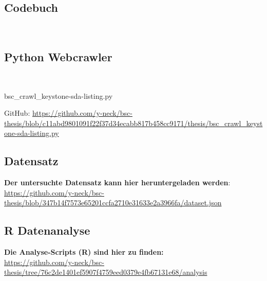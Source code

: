 \documentclass[12pt,a4paper]{article}        %
\begin{document}
\subsection{Codebuch}
~\label{appendix_codebook}

\subsection{Python Webcrawler}
~\label{appendix_crawler}
\begin{lstinputlisting}[language=Python, caption=Python Webcrawler für Keystone-SDA]{bsc_crawl_keystone-sda-listing.py}
\end{lstinputlisting}
GitHub: \url{https://github.com/y-neck/bsc-thesis/blob/c11abd9801091f22f37d34ecabb817b458cc9171/thesis/bsc_crawl_keystone-sda-listing.py}
\subsection{Datensatz}
\label{appendix_dataset}
\begin{tcolorbox}[
    width=\textwidth,    %
    boxrule=1pt,         %
    arc=0pt,             %
    colback=white,       %
    left=6pt, right=6pt, top=6pt, bottom=6pt
  ]
  \textbf{Der untersuchte Datensatz kann hier heruntergeladen werden}: \\
  \url{https://github.com/y-neck/bsc-thesis/blob/347b14f7573e65201ccfa2710e31633e2a3966fa/dataset.json}
\end{tcolorbox}
\subsection{R Datenanalyse}
\label{appendix_analysis}
\begin{tcolorbox}[
    width=\textwidth,
    boxrule=1pt,
    arc=0pt,
    colback=white,
    left=6pt, right=6pt, top=6pt, bottom=6pt
  ]
  \textbf{Die Analyse-Scripts (R) sind hier zu finden:}\\
  \url{https://github.com/y-neck/bsc-thesis/tree/76c2de1401ef5907f4759eed0379e4fb67131e68/analysis}
\end{tcolorbox}
\end{document}
